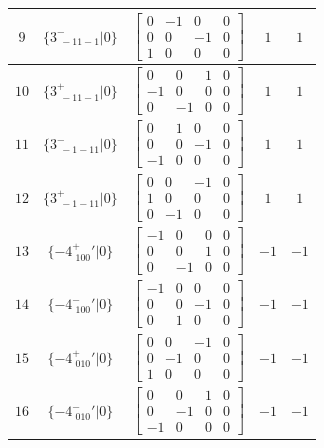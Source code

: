 \documentclass[fleqn,8pt]{jsarticle}
\begin{document}
\begin{longtable}{ccccc}
$ 9 $ & $ \{3^{-}_{\,\,-11-1}|0\} $ & $ \begin{bmatrix} 0 & -1 & 0 & 0 \\ 0 & 0 & -1 & 0 \\ 1 & 0 & 0 & 0 \end{bmatrix} $ & $ 1 $ & $ 1 $ \\ \hline
$ 10 $ & $ \{3^{+}_{\,\,-11-1}|0\} $ & $ \begin{bmatrix} 0 & 0 & 1 & 0 \\ -1 & 0 & 0 & 0 \\ 0 & -1 & 0 & 0 \end{bmatrix} $ & $ 1 $ & $ 1 $ \\ \hline
$ 11 $ & $ \{3^{-}_{\,\,-1-11}|0\} $ & $ \begin{bmatrix} 0 & 1 & 0 & 0 \\ 0 & 0 & -1 & 0 \\ -1 & 0 & 0 & 0 \end{bmatrix} $ & $ 1 $ & $ 1 $ \\ \hline
$ 12 $ & $ \{3^{+}_{\,\,-1-11}|0\} $ & $ \begin{bmatrix} 0 & 0 & -1 & 0 \\ 1 & 0 & 0 & 0 \\ 0 & -1 & 0 & 0 \end{bmatrix} $ & $ 1 $ & $ 1 $ \\ \hline
$ 13 $ & $ \{-4^{+}_{\,\,100}{}'|0\} $ & $ \begin{bmatrix} -1 & 0 & 0 & 0 \\ 0 & 0 & 1 & 0 \\ 0 & -1 & 0 & 0 \end{bmatrix} $ & $ -1 $ & $ -1 $ \\ \hline
$ 14 $ & $ \{-4^{-}_{\,\,100}{}'|0\} $ & $ \begin{bmatrix} -1 & 0 & 0 & 0 \\ 0 & 0 & -1 & 0 \\ 0 & 1 & 0 & 0 \end{bmatrix} $ & $ -1 $ & $ -1 $ \\ \hline
$ 15 $ & $ \{-4^{+}_{\,\,010}{}'|0\} $ & $ \begin{bmatrix} 0 & 0 & -1 & 0 \\ 0 & -1 & 0 & 0 \\ 1 & 0 & 0 & 0 \end{bmatrix} $ & $ -1 $ & $ -1 $ \\ \hline
$ 16 $ & $ \{-4^{-}_{\,\,010}{}'|0\} $ & $ \begin{bmatrix} 0 & 0 & 1 & 0 \\ 0 & -1 & 0 & 0 \\ -1 & 0 & 0 & 0 \end{bmatrix} $ & $ -1 $ & $ -1 $ \\ \hline

\end{longtable}
\end{document}
